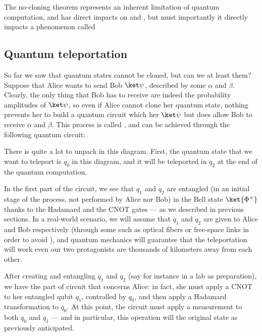 \documentclass[a4paper, 12pt]{report}
\begin{document}
The no-cloning theorem represents an inherent limitation of quantum computation, and has direct impacts on  and , but must importantly it directly impacts a phenomenon called 

\subsection{Quantum teleportation} \label{quantum teleportation}

So far we saw that quantum states cannot be cloned, but can we at least  them? Suppose that Alice wants to send Bob $\ket \psi$, described by some $\alpha$ and $\beta$. Clearly, the only thing that Bob has to receive are indeed the probability amplitudes of $\ket \psi$, so even if Alice cannot clone her quantum state, nothing prevents her to build a quantum circuit which  her $\ket \psi$ but does allow Bob to receive $\alpha$ and $\beta$. This process is called , and can be achieved through the following quantum circuit:


There is quite a lot to unpack in this diagram. First, the quantum state that we want to teleport is $q_0$ in this diagram, and it will be teleported in $q_2$ at the end of the quantum computation.

In the first part of the circuit, we see that $q_1$ and $q_2$ are entangled (in an initial stage of the process, not performed by Alice nor Bob) in the Bell state $\ket{\Phi^+}$ thanks to the Hadamard and the CNOT gates --- as we described in previous sections. In a real-world scenario, we will assume that $q_1$ and $q_2$ are given to Alice and Bob respectively (through some  such as optical fibers or free-space links in order to avoid ), and quantum mechanics will guarantee that the teleportation will work even our two protagonists are thousands of kilometers away from each other.

After creating and entangling $q_1$ and $q_2$ (say for instance in a lab as preparation), we have the part of circuit that concerns Alice: in fact, she must apply a CNOT to her entangled qubit $q_1$, controlled by $q_0$, and then apply a Hadamard transformation to $q_0$. At this point, the circuit must apply a measurement to both $q_0$ and $q_1$ --- and in particular, this operation will  the original state as previously anticipated.
\end{document}
